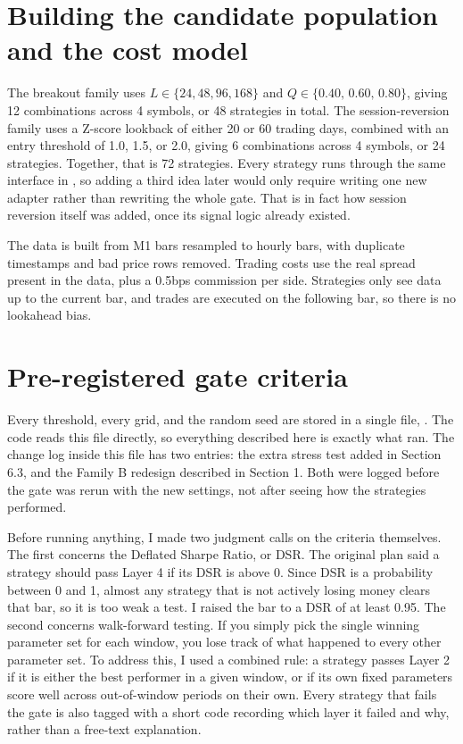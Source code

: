 \documentclass[11pt]{article}
\newcommand{\code}[1]{\texttt{\detokenize{#1}}}
\begin{document}
\section{Building the candidate population and the cost model}
The breakout family uses $L\in\{24, 48, 96, 168\}$ and $Q\in\{0.40,\,0.60,\,0.80\}$, giving 12 combinations across 4
symbols, or 48 strategies in total. The session-reversion family uses a Z-score lookback of either 20 or 60 trading
days, combined with an entry threshold of 1.0, 1.5, or 2.0, giving 6 combinations across 4 symbols, or 24 strategies.
Together, that is 72 strategies. Every strategy runs through the same interface in
\code{gate/instance_runner.py}, so adding a third idea later would only require writing one new adapter rather
than rewriting the whole gate. That is in fact how session reversion itself was added, once its signal logic
already existed.

The data is built from M1 bars resampled to hourly bars, with duplicate timestamps and bad price rows removed.
Trading costs use the real spread present in the data, plus a 0.5bps commission per side. Strategies only see data
up to the current bar, and trades are executed on the following bar, so there is no lookahead bias.

\section{Pre-registered gate criteria}
Every threshold, every grid, and the random seed are stored in a single file, \code{gate/pre_registration.yaml}.
The code reads this file directly, so everything described here is exactly what ran. The change log inside this
file has two entries: the extra stress test added in Section 6.3, and the Family B redesign described in Section 1.
Both were logged before the gate was rerun with the new settings, not after seeing how the strategies performed.

Before running anything, I made two judgment calls on the criteria themselves. The first concerns the Deflated
Sharpe Ratio, or DSR. The original plan said a strategy should pass Layer 4 if its DSR is above 0. Since DSR is a
probability between 0 and 1, almost any strategy that is not actively losing money clears that bar, so it is too
weak a test. I raised the bar to a DSR of at least 0.95. The second concerns walk-forward testing. If you simply
pick the single winning parameter set for each window, you lose track of what happened to every other parameter
set. To address this, I used a combined rule: a strategy passes Layer 2 if it is either the best performer in a
given window, or if its own fixed parameters score well across out-of-window periods on their own. Every strategy
that fails the gate is also tagged with a short code recording which layer it failed and why, rather than a free-text
explanation.
\end{document}
